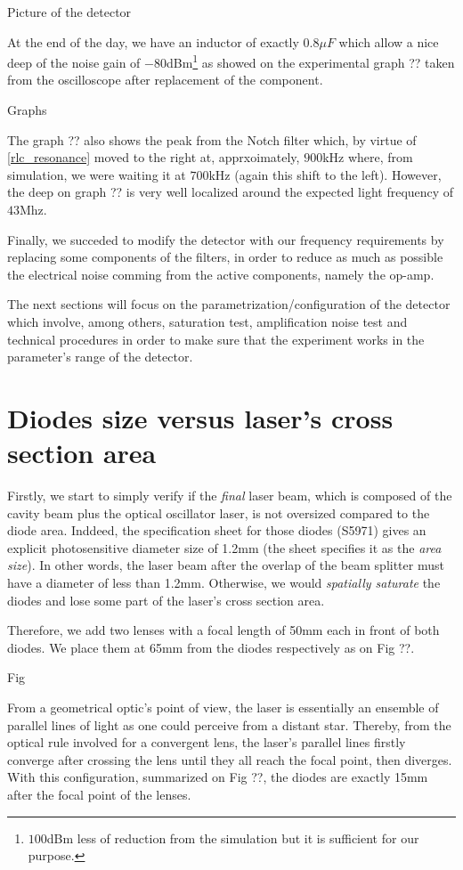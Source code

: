 \documentclass[12pt]{report}
\begin{document}
Picture of the detector

At the end of the day, we have an inductor of exactly $0.8\mu F$ which allow a nice deep of the noise gain of $-80$dBm\footnote{$100$dBm less of reduction from the simulation but it is sufficient for our purpose.} as showed on the experimental graph ?? taken from the oscilloscope after replacement of the component.

Graphs

The graph ?? also shows the peak from the Notch filter which, by virtue of \eqref{rlc_resonance} moved to the right at, apprxoimately, $900$kHz where, from simulation, we were waiting it at $700$kHz (again this shift to the left). However, the deep on graph ?? is very well localized around the expected light frequency of $43$Mhz.

Finally, we succeded to modify the detector with our frequency requirements by replacing some components of the filters, in order to reduce as much as possible the electrical noise comming from the active components, namely the op-amp.

The next sections will focus on the parametrization/configuration of the detector which involve, among others, saturation test, amplification noise test and technical procedures in order to make sure that the experiment works in the parameter's range of the detector.

\section{Diodes size versus laser's cross section area}

Firstly, we start to simply verify if the \textit{final} laser beam, which is composed of the cavity beam plus the optical oscillator laser, is not oversized compared to the diode area. Inddeed, the specification sheet for those diodes (S5971) gives an explicit photosensitive diameter size of 1.2mm (the sheet specifies it as the \textit{area size}). In other words, the laser beam after the overlap of the beam splitter must have a diameter of less than 1.2mm. Otherwise, we would \textit{spatially saturate} the diodes and lose some part of the laser's cross section area.

Therefore, we add two lenses with a focal length of 50mm each in front of both diodes. We place them at 65mm from the diodes respectively as on Fig ??. 

Fig

From a geometrical optic's point of view, the laser is essentially an ensemble of parallel lines of light as one could perceive from a distant star. Thereby, from the optical rule involved for a convergent lens, the laser's parallel lines firstly converge after crossing the lens until they all reach the focal point, then diverges. With this configuration, summarized on Fig ??, the diodes are exactly 15mm after the focal point of the lenses. 
\end{document}
